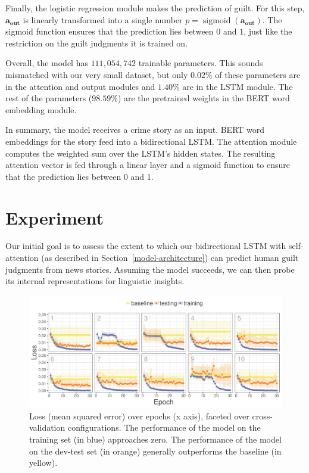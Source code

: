 \documentclass[11pt,a4paper]{article}
\DeclareMathOperator{\sigmoid}{sigmoid}
\newcommand{\aout}{\mathbf{a_{\text{out}}}}
\begin{document}
Finally, the logistic regression module makes the prediction of guilt. For this step, $\aout$ is linearly transformed into a single number $p = \sigmoid(\aout)$. The sigmoid function ensures that the prediction lies between $0$ and $1$, just like the restriction on the guilt judgments it is trained on.

Overall, the model has $111,054,742$ trainable parameters. This sounds mismatched with our very small dataset, but only $0.02\%$ of these parameters are in the attention and output modules and $1.40\%$ are in the LSTM module. The rest of the parameters ($98.59\%$) are the pretrained weights in the BERT word embedding module.

In summary, the model receives a crime story as an input. BERT word embeddings for the story feed into a bidirectional LSTM. The attention module computes the weighted sum over the LSTM's hidden states. The resulting attention vector is fed through a linear layer and a sigmoid function to ensure that the prediction lies between 0 and 1.




\section{Experiment}

Our initial goal is to assess the extent to which our bidirectional LSTM with self-attention (as described in Section~\ref{model-architecture}) can predict human guilt judgments from news stories. Assuming the model succeeds, we can then probe its internal representations for linguistic insights.

\begin{figure}
  \includegraphics[width=\linewidth]{graphs/lossPlotCropped.pdf}
  \caption{Loss (mean squared error) over epochs (x axis), faceted over cross-validation configurations. The performance of the model on the training set (in blue) approaches zero. The performance of the model on the dev-test set (in orange) generally outperforms the baseline (in yellow).}
  \label{fig:loss}
\end{figure}
\end{document}
